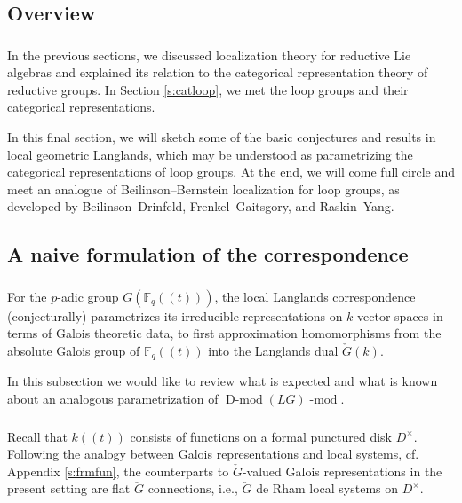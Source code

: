 \documentclass[10pt]{amsart}
\newcommand{\Fqt}{\Fq(\!(t)\!)}
\newcommand{\on}{\operatorname}
\renewcommand{\mod}{\on{-mod}}
\newcommand{\Dmod}{\on{D-mod}}
\newcommand{\Fq}{\mathbb{F}_q}
\theoremstyle{remark}
\numberwithin{equation}{section}
\newcommand{\cG}{\check{G}}
\renewcommand{\mod}{\operatorname{-mod}}
\begin{document}
	\label{s:affbbloc}
	
	\subsection{Overview}
	
	\subsubsection{}  In the previous sections, we discussed localization theory for reductive Lie algebras and explained its relation to the categorical representation theory of reductive groups. In Section \ref{s:catloop}, we met the loop groups and their categorical representations. 
	
	
	In this final section, we will sketch some of 
	the basic conjectures and results in local 
	geometric Langlands, which may be understood as parametrizing the categorical representations of loop groups.  At the end, we will come full circle and meet an 
	analogue 
	of Beilinson--Bernstein localization for loop groups, as developed by 
	Beilinson--Drinfeld, Frenkel--Gaitsgory, and Raskin--Yang. 
	
	
	\subsection{A naive formulation of the correspondence}
	
	
	
	\subsubsection{} For the $p$-adic group $G(\Fqt)$, the local Langlands 
	correspondence (conjecturally) parametrizes its irreducible representations 
	on $k$ vector spaces in terms of Galois theoretic data, to first 
	approximation homomorphisms 
	from the absolute 
	Galois group of $\Fqt$ into the Langlands dual $\check{G}(k)$.
	
	
	In this subsection we would like to review what is expected and what is 
	known about an analogous parametrization of $\Dmod(LG)\mod$. 
	
	
	
	\subsubsection{} Recall that $k(\!(t)\!)$ consists of functions on a formal 
	punctured disk $D^\times$. Following the analogy between Galois 
	representations and local systems, cf. Appendix \ref{s:frmfun}, the counterparts to $\cG$-valued Galois 
	representations in the present setting are flat $\check{G}$ connections, i.e., $\cG$ de Rham local 
	systems 
	on 
	$D^\times$.
	
\end{document}
